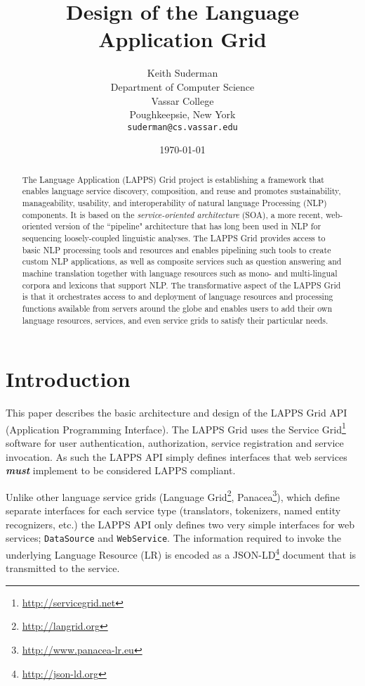 \documentclass{article}
\newcommand{\lapps}{LAPPS\xspace}
\newcommand{\source}{\texttt{DataSource}\xspace}
\newcommand{\service}{\texttt{WebService}\xspace}
\newcommand{\definedterm}[1]{\textbf{\textit{#1}}\xspace}
\newcommand{\must}{\definedterm{must}}
\begin{document}
\title{Design of the Language Application Grid}
\author{Keith Suderman\\
Department of Computer Science\\
Vassar College\\
Poughkeepsie, New York\\
\texttt{suderman@cs.vassar.edu}}
\date{\today}
\maketitle

\begin{abstract}
The Language Application (LAPPS) Grid project
is establishing a
framework that enables language service discovery, composition, and reuse and promotes sustainability, manageability, usability, and interoperability of natural language Processing (NLP) components. It is based on the {\it service-oriented architecture} (SOA), a more recent, web-oriented version of the  ``pipeline" architecture that has long been used in NLP for sequencing loosely-coupled linguistic analyses. 
The LAPPS Grid provides access to basic NLP processing tools and resources and enables pipelining such tools to create custom NLP applications, as well as
composite services such as question answering and machine translation together with language resources such as mono- and multi-lingual corpora and lexicons that support NLP. 
The transformative aspect of the LAPPS Grid is that it orchestrates  access to and deployment of language resources and processing functions available from servers around the globe and enables users to add their own language resources, services, and even service grids to satisfy their particular needs.
\end{abstract}


\section{Introduction}

This paper describes the basic architecture and design of the \lapps Grid API (Application Programming Interface). The \lapps Grid uses the Service Grid\footnote{\url{http://servicegrid.net}} software for user authentication, authorization, service registration and service invocation. As such the \lapps API simply defines interfaces that web services \must implement to be considered \lapps compliant.

Unlike other language service grids (Language Grid\footnote{\url{http://langrid.org}}, Panacea\footnote{\url{http://www.panacea-lr.eu}}), which define separate interfaces for each service type (translators, tokenizers, named entity recognizers, etc.) the \lapps API only defines two very simple interfaces for web services; \source and \service. The information required to invoke the underlying Language Resource (LR) is encoded as a JSON-LD\footnote{\url{http://json-ld.org}} document that is transmitted to the service.
\end{document}
